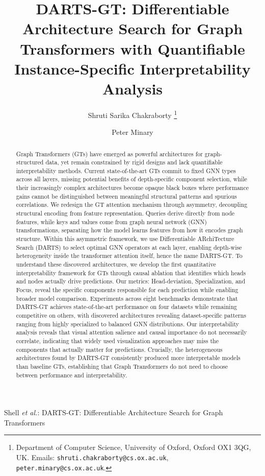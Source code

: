 \documentclass[lettersize,journal]{IEEEtran}
\begin{document}
\title{DARTS-GT: Differentiable Architecture Search for Graph Transformers with Quantifiable Instance-Specific Interpretability Analysis}

\author{Shruti Sarika Chakraborty
\thanks{Department of Computer Science, University of Oxford, Oxford OX1 3QG, UK. Emails: \texttt{shruti.chakraborty@cs.ox.ac.uk}, \texttt{peter.minary@cs.ox.ac.uk}.}%
        \and
        Peter Minary}



%
{Shell \MakeLowercase{\textit{et al.}}: DARTS-GT: Differentiable Architecture Search for Graph Transformers}



\maketitle

\begin{abstract}
Graph Transformers (GTs) have emerged as powerful architectures for graph-structured data, yet remain constrained by rigid designs and lack quantifiable interpretability methods. Current state-of-the-art GTs commit to fixed GNN types across all layers, missing potential benefits of depth-specific component selection, while their increasingly complex architectures become opaque black boxes where performance gains cannot be distinguished between meaningful structural patterns and spurious correlations. We redesign the GT attention mechanism through asymmetry, decoupling structural encoding from feature representation. Queries derive directly from node features, while keys and values come from graph neural network (GNN) transformations, separating how the model learns features from how it encodes graph structure. Within this asymmetric framework, we use Differentiable ARchiTecture Search (DARTS) to select optimal GNN operators at each layer, enabling depth-wise heterogeneity inside the transformer attention itself, hence the name DARTS-GT.
To understand these discovered architectures, we develop the first quantitative interpretability framework for GTs through causal ablation that identifies which heads and nodes actually drive predictions. Our metrics: Head-deviation, Specialization, and Focus, reveal the specific components responsible for each prediction while enabling broader model comparison.  Experiments across eight benchmarks demonstrate that DARTS-GT achieves state-of-the-art performance on four datasets while remaining competitive on others, with discovered architectures revealing dataset-specific patterns ranging from highly specialized to balanced GNN distributions. Our interpretability analysis reveals that visual attention salience and causal importance do not necessarily correlate, indicating that widely used visualization approaches may miss the components that actually matter for predictions. Crucially, the heterogeneous architectures found by DARTS-GT consistently produced more interpretable models than baseline GTs, establishing that Graph Transformers do not need to choose between performance and interpretability.
\end{abstract}
\end{document}
